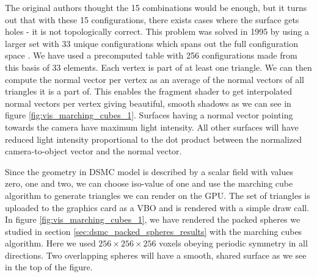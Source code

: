 The original authors thought the 15 combinations would be enough, but it turns out that with these 15 configurations, there exists cases where the surface gets holes - it is not topologically correct. This problem was solved in 1995 by using a larger set with 33 unique configurations which spans out the full configuration space \cite{chernyaev1995marching}. We have used a precomputed table with 256 configurations made from this basis of 33 elements. Each vertex is part of at least one triangle. We can then compute the normal vector per vertex as an average of the normal vectors of all triangles it is a part of. This enables the fragment shader to get interpolated normal vectors per vertex giving beautiful, smooth shadows as we can see in figure \ref{fig:vis_marching_cubes_1}. Surfaces having a normal vector pointing towards the camera have maximum light intensity. All other surfaces will have reduced light intensity proportional to the dot product between the normalized camera-to-object vector and the normal vector.

Since the geometry in DSMC model is described by a scalar field with values zero, one and two, we can choose iso-value of one and use the marching cube algorithm to generate triangles we can render on the GPU. The set of triangles is uploaded to the graphics card as a VBO and is rendered with a simple draw call. In figure \ref{fig:vis_marching_cubes_1}, we have rendered the packed spheres we studied in section \ref{sec:dsmc_packed_spheres_results} with the marching cubes algorithm. Here we used $256\times256\times256$ voxels obeying periodic symmetry in all directions. Two overlapping spheres will have a smooth, shared surface as we see in the top of the figure.

